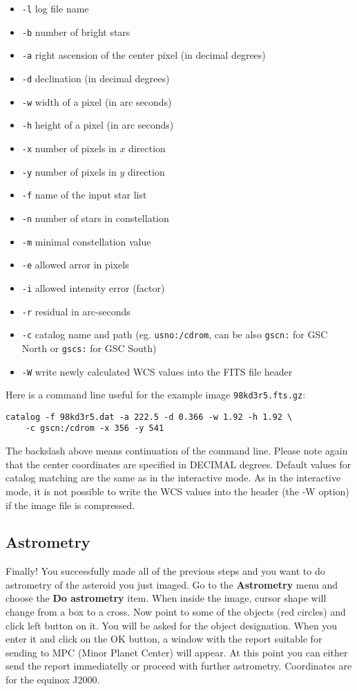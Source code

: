 \documentclass[11pt]{article}
\begin{document}
\begin{itemize}
\item \verb=-l= log file name
\item \verb=-b= number of bright stars
\item \verb=-a= right ascension of the center pixel (in decimal degrees)
\item \verb=-d= declination (in decimal degrees)
\item \verb=-w= width of a pixel (in arc seconds)
\item \verb=-h= height of a pixel (in arc seconds)
\item \verb=-x= number of pixels in $x$ direction
\item \verb=-y= number of pixels in $y$ direction
\item \verb=-f= name of the input star list
\item \verb=-n= number of stars in constellation
\item \verb=-m= minimal constellation value
\item \verb=-e= allowed arror in pixels
\item \verb=-i= allowed intensity error (factor) 
\item \verb=-r= residual in arc-seconds
\item \verb=-c= catalog name and path (eg. \verb=usno:/cdrom=, can be
also \verb=gscn:= for GSC North or \verb=gscs:= for GSC South)
\item \verb=-W= write newly calculated WCS values into the FITS file header
\end{itemize}

Here is a command line useful for the example image \verb=98kd3r5.fts.gz=:

\begin{verbatim}
catalog -f 98kd3r5.dat -a 222.5 -d 0.366 -w 1.92 -h 1.92 \
	-c gscn:/cdrom -x 356 -y 541
\end{verbatim}
The backslash above means continuation of the command line.  Please
note again that the center coordinates are specified in DECIMAL
degrees.  Default values for catalog matching are the same as in the
interactive mode.   As in the interactive mode, it is not possible to
write the WCS values into the header (the -W option) if the image file
is compressed.

\subsection{Astrometry}
\label{astrometry}
Finally!  You successfully made all of the previous steps and you want
to do astrometry of the asteroid you just imaged.  Go to the
\textbf{Astrometry} menu and choose the \textbf{Do astrometry} item.
When inside the image, cursor shape will change from a box to a
cross.  Now point to some of the objects (red circles) and click left
button on it.  You will be asked for the object designation.  When you
enter it and click on the OK button, a window with the report suitable
for sending to MPC (Minor Planet Center) will appear.  At this point
you can either send the report immediatelly or proceed with further
astrometry.  Coordinates are for the equinox J2000.
\end{document}
